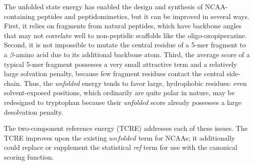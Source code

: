 The unfolded state energy has enabled the design and synthesis of NCAA-containing peptides and peptidomimetics\cite{lao_rational_2014,drew_adding_2013}, but it can be improved in several ways.
First, it relies on fragments from natural peptides, which have backbone angles that may not correlate well to non-peptidic scaffolds like the oligo-oxopiperazine.
Second, it is not impossible to mutate the central residue of a 5-mer fragment to a $\beta$-amino acid due to its additional backbone atom.
Third, the average score of a typical 5-mer fragment possesses a very small attractive term and a relatively large solvation penalty, because few fragment residues contact the central side-chain.
Thus, the \textit{unfolded} energy tends to favor large, hydrophobic residues: even solvent-exposed positions, which ordinarily are quite polar in nature, may be redesigned to tryptophan because their \textit{unfolded} score already possesses a large desolvation penalty.

The two-component reference energy (TCRE) addresses each of these issues.
The TCRE improves upon the existing $unfolded$ term for NCAAs; it additionally could replace or supplement the statistical \textit{ref} term for use with the canonical scoring function.
